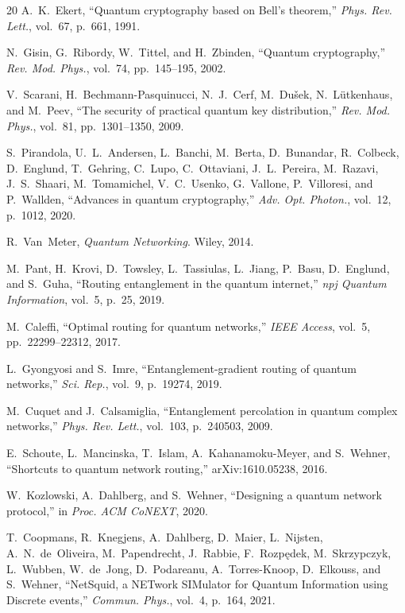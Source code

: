 \documentclass[10pt,a4paper]{article}
\begin{document}
\begin{thebibliography}{20}
A.~K.~Ekert, ``Quantum cryptography based on Bell's theorem,''
\emph{Phys. Rev. Lett.}, vol.~67, p.~661, 1991.

N.~Gisin, G.~Ribordy, W.~Tittel, and H.~Zbinden,
``Quantum cryptography,''
\emph{Rev. Mod. Phys.}, vol.~74, pp.~145--195, 2002.

V.~Scarani, H.~Bechmann-Pasquinucci, N.~J.~Cerf, M.~Du\v{s}ek,
N.~L\"utkenhaus, and M.~Peev,
``The security of practical quantum key distribution,''
\emph{Rev. Mod. Phys.}, vol.~81, pp.~1301--1350, 2009.

S.~Pirandola, U.~L.~Andersen, L.~Banchi, M.~Berta, D.~Bunandar,
R.~Colbeck, D.~Englund, T.~Gehring, C.~Lupo, C.~Ottaviani,
J.~L.~Pereira, M.~Razavi, J.~S.~Shaari, M.~Tomamichel,
V.~C.~Usenko, G.~Vallone, P.~Villoresi, and P.~Wallden,
``Advances in quantum cryptography,''
\emph{Adv. Opt. Photon.}, vol.~12, p.~1012, 2020.

R.~Van~Meter, \emph{Quantum Networking}.  Wiley, 2014.

M.~Pant, H.~Krovi, D.~Towsley, L.~Tassiulas, L.~Jiang, P.~Basu,
D.~Englund, and S.~Guha,
``Routing entanglement in the quantum internet,''
\emph{npj Quantum Information}, vol.~5, p.~25, 2019.

M.~Caleffi, ``Optimal routing for quantum networks,''
\emph{IEEE Access}, vol.~5, pp.~22299--22312, 2017.

L.~Gyongyosi and S.~Imre,
``Entanglement-gradient routing of quantum networks,''
\emph{Sci. Rep.}, vol.~9, p.~19274, 2019.

M.~Cuquet and J.~Calsamiglia,
``Entanglement percolation in quantum complex networks,''
\emph{Phys. Rev. Lett.}, vol.~103, p.~240503, 2009.

E.~Schoute, L.~Mancinska, T.~Islam, A.~Kahanamoku-Meyer, and
S.~Wehner, ``Shortcuts to quantum network routing,''
arXiv:1610.05238, 2016.

W.~Kozlowski, A.~Dahlberg, and S.~Wehner,
``Designing a quantum network protocol,''
in \emph{Proc. ACM CoNEXT}, 2020.

T.~Coopmans, R.~Knegjens, A.~Dahlberg, D.~Maier, L.~Nijsten,
A.~N.~de~Oliveira, M.~Papendrecht, J.~Rabbie, F.~Rozp\k{e}dek,
M.~Skrzypczyk, L.~Wubben, W.~de~Jong, D.~Podareanu,
A.~Torres-Knoop, D.~Elkouss, and S.~Wehner,
``NetSquid, a NETwork SIMulator for Quantum Information using Discrete
events,''
\emph{Commun. Phys.}, vol.~4, p.~164, 2021.


\end{thebibliography}
\end{document}

